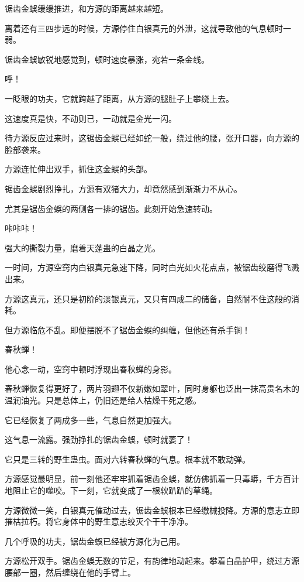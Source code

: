 \begin{this_body}
锯齿金蜈缓缓推进，和方源的距离越来越短。

离着还有三四步远的时候，方源停住白银真元的外泄，这就导致他的气息顿时一弱。

锯齿金蜈敏锐地感觉到，顿时速度暴涨，宛若一条金线。

呼！

一眨眼的功夫，它就跨越了距离，从方源的腿肚子上攀绕上去。

这速度真是快，不动则已，一动就是金光一闪。

待方源反应过来时，这锯齿金蜈已经如蛇一般，绕过他的腰，张开口器，向方源的脸部袭来。

方源连忙伸出双手，抓住这金蜈的头部。

锯齿金蜈剧烈挣扎，方源有双猪大力，却竟然感到渐渐力不从心。

尤其是锯齿金蜈的两侧各一排的锯齿。此刻开始急速转动。

咔咔咔！

强大的撕裂力量，磨着天蓬蛊的白晶之光。

一时间，方源空窍内白银真元急速下降，同时白光如火花点点，被锯齿绞磨得飞溅出来。

方源这真元，还只是初阶的淡银真元，又只有四成二的储备，自然耐不住这般的消耗。

但方源临危不乱。即便摆脱不了锯齿金蜈的纠缠，但他还有杀手锏！

春秋蝉！

他心念一动，空窍中顿时浮现出春秋蝉的身影。

春秋蝉恢复得更好了，两片羽翅不仅新嫩如翠叶，同时身躯也泛出一抹高贵名木的温润油光。只是总体上，仍旧还是给人枯燥干死之感。

它已经恢复了两成多一些，气息自然更加强大。

这气息一流露。强劲挣扎的锯齿金蜈，顿时就萎了！

它只是三转的野生蛊虫。面对六转春秋蝉的气息。根本就不敢动弹。

方源感觉最明显，前一刻他还牢牢抓着锯齿金蜈，就仿佛抓着一只毒蟒，千方百计地阻止它的噬咬。下一刻，它就变成了一根软趴趴的草绳。

方源微微一笑，白银真元催动过去，锯齿金蜈根本已经缴械投降。方源的意志立即摧枯拉朽。将它身体中的野生意志绞灭个干干净净。

几个呼吸的功夫，锯齿金蜈已经被方源化为己用。

方源松开双手。锯齿金蜈无数的节足，有韵律地动起来。攀着白晶护甲，绕过方源腰部一圈，然后缠绕在他的手臂上。


\end{this_body}
